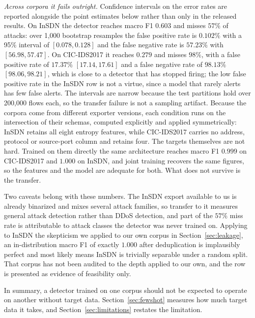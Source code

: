 \documentclass{ieeeaccess}
\begin{document}
\emph{Across corpora it fails outright.} Confidence intervals on the error
rates are reported alongside the point estimates below rather than only in the
released results. On InSDN the detector reaches
macro F1 $0.603$ and misses $57\%$ of attacks: over 1,000 bootstrap resamples the
false positive rate is $0.102\%$ with a 95\% interval of $[0.078, 0.128]$ and the
false negative rate is $57.23\%$ with $[56.98, 57.47]$. On CIC-IDS2017 it reaches
$0.279$ and misses $98\%$, with a false positive rate of $17.37\%$
$[17.14, 17.61]$ and a false negative rate of $98.13\%$ $[98.06, 98.21]$, which is
close to a detector that has stopped firing; the low false positive rate in the
InSDN row is not a virtue, since a model that rarely alerts has few false alerts.
The intervals are narrow because the test partitions hold over 200,000 flows
each, so the transfer failure is not a sampling artifact. Because the corpora
come from different exporter versions,
each condition runs on the intersection of their schemas, computed explicitly and
applied symmetrically: InSDN retains all eight entropy features, while
CIC-IDS2017 carries no address, protocol or source-port column and retains four.
The targets themselves are not hard. Trained on them directly the same
architecture reaches macro F1 $0.999$ on CIC-IDS2017 and $1.000$ on InSDN, and
joint training recovers the same figures, so the features and the model are
adequate for both. What does not survive is the transfer.

Two caveats belong with these numbers. The InSDN export available to us is
already binarized and mixes several attack families, so transfer to it measures
general attack detection rather than DDoS detection, and part of the $57\%$ miss
rate is attributable to attack classes the detector was never trained on.
Applying to InSDN the skepticism we applied to our own corpus in
Section~\ref{sec:leakage}, an in-distribution macro F1 of exactly $1.000$ after
deduplication is implausibly perfect and most likely means InSDN is trivially
separable under a random split. That corpus has not been audited to the depth applied to our own, and the row
is presented as evidence of feasibility only.

In summary, a detector trained on one corpus should not be expected to operate
on another without target data. Section~\ref{sec:fewshot}
measures how much target data it takes, and Section~\ref{sec:limitations}
restates the limitation.
\end{document}

